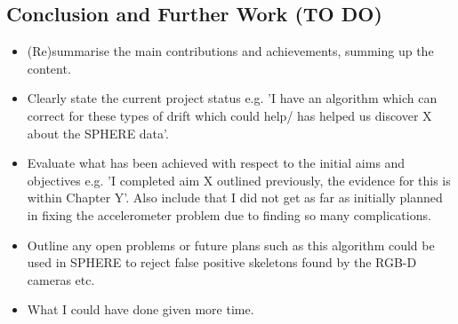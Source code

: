 \documentclass{article}
\begin{document}
\subsection{Conclusion and Further Work (TO DO)}
\begin{itemize}
\item (Re)summarise the main contributions and achievements, summing up the content.
\item Clearly state the current project status e.g. 'I have an algorithm which can correct for these types of drift which could help/ has helped us discover X about the SPHERE data'.
\item Evaluate what has been achieved with respect to the initial aims and objectives e.g. 'I completed aim X outlined previously, the evidence for this is within
    Chapter Y'. Also include that I did not get as far as initially planned in fixing the accelerometer problem due to finding so many complications.
\item Outline any open problems or future plans such as this algorithm could be used in SPHERE to reject false positive skeletons found by the RGB-D cameras etc.
\item What I could have done given more time.
\end{itemize}
  
\end{document}
